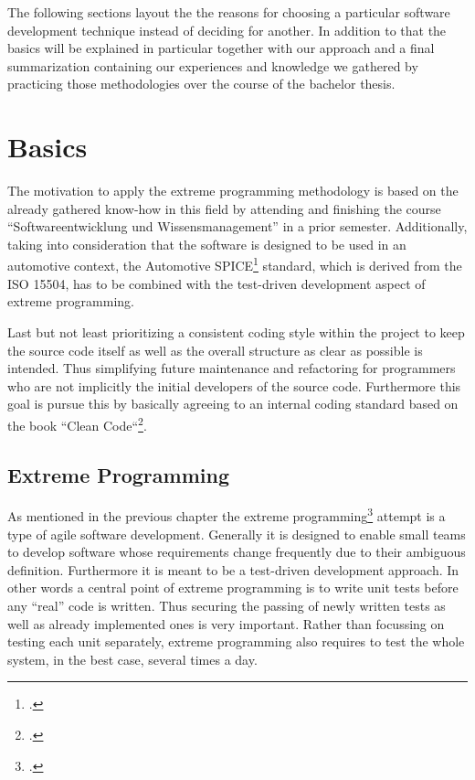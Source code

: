 The following sections layout the the reasons for choosing a particular software development technique instead of deciding 
for another. In addition to that the basics will be explained in particular together with our approach and a final summarization 
containing our experiences and knowledge we gathered by practicing those methodologies over the course of the bachelor thesis.

\section{Basics}

The motivation to apply the extreme programming methodology is based on the already gathered know-how in this field by attending 
and finishing the course “Softwareentwicklung und Wissensmanagement” in a prior semester. Additionally, taking into consideration 
that the software is designed to be used in an automotive context, the Automotive SPICE\footcite{AUTOSPICE} standard, which is derived from the ISO 15504, 
has to be combined with the test-driven development aspect of extreme programming.

Last but not least prioritizing a consistent coding style within the project to keep the source code itself as well as the overall 
structure as clear as possible is intended. Thus simplifying future maintenance and refactoring for programmers who are not implicitly 
the initial developers of the source code. Furthermore this goal is pursue this by basically agreeing to an internal coding standard 
based on the book “Clean Code``\footcite{CLEANCODE}.

\subsection{Extreme Programming}

As mentioned in the previous chapter the extreme programming\footcite{BECK} attempt is a type of agile software development. Generally it is designed 
to enable small teams to develop software whose requirements change frequently due to their ambiguous definition. Furthermore it is meant 
to be a test-driven development approach. In other words a central point of extreme programming is to write unit tests before any “real” 
code is written. Thus securing the passing of newly written tests as well as already implemented ones is very important. Rather than 
focussing on testing each unit separately, extreme programming also requires to test the whole system, in the best case, several times a day.

